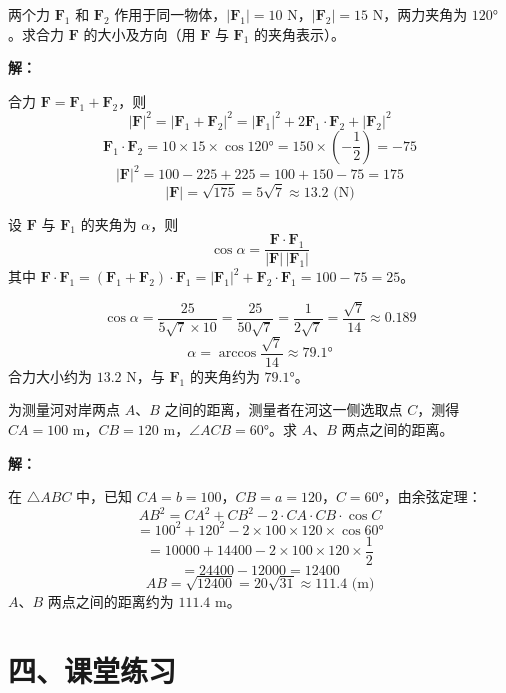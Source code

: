 \documentclass[12pt, a4paper]{ctexart}
\begin{document}
\begin{appbox}[【应用2】力学问题]
两个力 $\boldsymbol{F}_1$ 和 $\boldsymbol{F}_2$ 作用于同一物体，$|\boldsymbol{F}_1|=10$ N，$|\boldsymbol{F}_2|=15$ N，两力夹角为 $120°$。求合力 $\boldsymbol{F}$ 的大小及方向（用 $\boldsymbol{F}$ 与 $\boldsymbol{F}_1$ 的夹角表示）。

\textbf{解：}

合力 $\boldsymbol{F}=\boldsymbol{F}_1+\boldsymbol{F}_2$，则
\[
|\boldsymbol{F}|^2=|\boldsymbol{F}_1+\boldsymbol{F}_2|^2=|\boldsymbol{F}_1|^2+2\boldsymbol{F}_1\cdot\boldsymbol{F}_2+|\boldsymbol{F}_2|^2
\]
\[
\boldsymbol{F}_1\cdot\boldsymbol{F}_2=10\times15\times\cos120°=150\times\left(-\frac{1}{2}\right)=-75
\]
\[
|\boldsymbol{F}|^2=100-225+225=100+150-75=175
\]
\[
|\boldsymbol{F}|=\sqrt{175}=5\sqrt{7}\approx13.2 \text{ (N)}
\]

设 $\boldsymbol{F}$ 与 $\boldsymbol{F}_1$ 的夹角为 $\alpha$，则
\[
\cos\alpha=\frac{\boldsymbol{F}\cdot\boldsymbol{F}_1}{|\boldsymbol{F}|\,|\boldsymbol{F}_1|}
\]
其中 $\boldsymbol{F}\cdot\boldsymbol{F}_1=(\boldsymbol{F}_1+\boldsymbol{F}_2)\cdot\boldsymbol{F}_1=|\boldsymbol{F}_1|^2+\boldsymbol{F}_2\cdot\boldsymbol{F}_1=100-75=25$。

\[
\cos\alpha=\frac{25}{5\sqrt{7}\times10}=\frac{25}{50\sqrt{7}}=\frac{1}{2\sqrt{7}}=\frac{\sqrt{7}}{14}\approx0.189
\]
\[
\alpha=\arccos\frac{\sqrt{7}}{14}\approx79.1°
\]
合力大小约为 $13.2$ N，与 $\boldsymbol{F}_1$ 的夹角约为 $79.1°$。
\end{appbox}

\begin{appbox}[【应用3】测量问题]
为测量河对岸两点 $A$、$B$ 之间的距离，测量者在河这一侧选取点 $C$，测得 $CA=100$ m，$CB=120$ m，$\angle ACB=60°$。求 $A$、$B$ 两点之间的距离。

\textbf{解：}

在 $\triangle ABC$ 中，已知 $CA=b=100$，$CB=a=120$，$C=60°$，由余弦定理：
\[
AB^2=CA^2+CB^2-2\cdot CA\cdot CB\cdot\cos C
\]
\[
=100^2+120^2-2\times100\times120\times\cos60°
\]
\[
=10000+14400-2\times100\times120\times\frac{1}{2}
\]
\[
=24400-12000=12400
\]
\[
AB=\sqrt{12400}=20\sqrt{31}\approx111.4 \text{ (m)}
\]
$A$、$B$ 两点之间的距离约为 $111.4$ m。
\end{appbox}

\section*{\textcolor{tipgreen}{四、课堂练习}}
\end{document}
